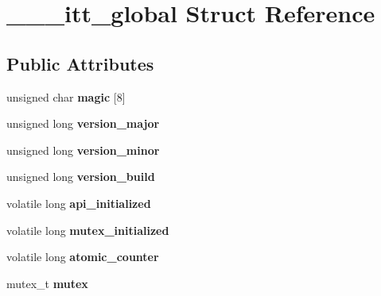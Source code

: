 \hypertarget{struct______itt__global}{}\section{\+\_\+\+\_\+\+\_\+itt\+\_\+global Struct Reference}
\label{struct______itt__global}
\subsection*{Public Attributes}
\begin{DoxyCompactItemize}
\item 
\hypertarget{struct______itt__global_ab0e52e46d4af19f31c990bedcd6948df}{}unsigned char {\bfseries magic} \mbox{[}8\mbox{]}\label{struct______itt__global_ab0e52e46d4af19f31c990bedcd6948df}

\item 
\hypertarget{struct______itt__global_aaad26e96e84268d03a08cb840a2113c3}{}unsigned long {\bfseries version\+\_\+major}\label{struct______itt__global_aaad26e96e84268d03a08cb840a2113c3}

\item 
\hypertarget{struct______itt__global_a4487d06049ec27f22ad144eb2f57e0b5}{}unsigned long {\bfseries version\+\_\+minor}\label{struct______itt__global_a4487d06049ec27f22ad144eb2f57e0b5}

\item 
\hypertarget{struct______itt__global_a4ad1debe7bab64e55300de356e7f73a9}{}unsigned long {\bfseries version\+\_\+build}\label{struct______itt__global_a4ad1debe7bab64e55300de356e7f73a9}

\item 
\hypertarget{struct______itt__global_adb68468b1a0fa798009ea4e128ae98f0}{}volatile long {\bfseries api\+\_\+initialized}\label{struct______itt__global_adb68468b1a0fa798009ea4e128ae98f0}

\item 
\hypertarget{struct______itt__global_a6c90634b5939d5718f63161edf0ee002}{}volatile long {\bfseries mutex\+\_\+initialized}\label{struct______itt__global_a6c90634b5939d5718f63161edf0ee002}

\item 
\hypertarget{struct______itt__global_a43a21d694a84edc516d1d4cc07d65313}{}volatile long {\bfseries atomic\+\_\+counter}\label{struct______itt__global_a43a21d694a84edc516d1d4cc07d65313}

\item 
\hypertarget{struct______itt__global_ad09e87e07b15a780422e4ae565e06c5e}{}mutex\+\_\+t {\bfseries mutex}\label{struct______itt__global_ad09e87e07b15a780422e4ae565e06c5e}


\end{DoxyCompactItemize}
